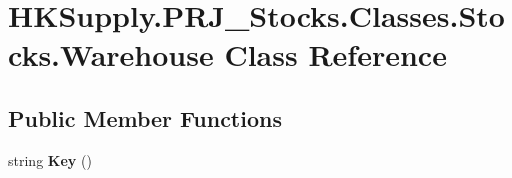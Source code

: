 \hypertarget{class_h_k_supply_1_1_p_r_j___stocks_1_1_classes_1_1_stocks_1_1_warehouse}{}\section{H\+K\+Supply.\+P\+R\+J\+\_\+\+Stocks.\+Classes.\+Stocks.\+Warehouse Class Reference}
\label{class_h_k_supply_1_1_p_r_j___stocks_1_1_classes_1_1_stocks_1_1_warehouse}
\subsection*{Public Member Functions}
\begin{DoxyCompactItemize}
\item 
\mbox{\label{class_h_k_supply_1_1_p_r_j___stocks_1_1_classes_1_1_stocks_1_1_warehouse_a754783187af1f36e7cfc7bba77c83ebd}} 
string {\bfseries Key} ()
\end{DoxyCompactItemize}
